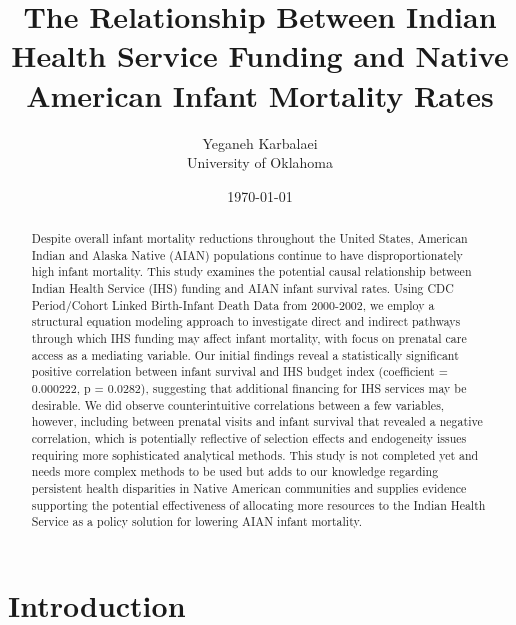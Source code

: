 \documentclass[12pt]{article}
\title{The Relationship Between Indian Health Service Funding and Native American Infant Mortality Rates}
\author{Yeganeh Karbalaei\\
University of Oklahoma}
\date{\today}
\begin{document}
\maketitle
{}

\begin{abstract}
Despite overall infant mortality reductions throughout the United States, American Indian and Alaska Native (AIAN) populations continue to have disproportionately high infant mortality. This study examines the potential causal relationship between Indian Health Service (IHS) funding and AIAN infant survival rates. Using CDC Period/Cohort Linked Birth-Infant Death Data from 2000-2002, we employ a structural equation modeling approach to investigate direct and indirect pathways through which IHS funding may affect infant mortality, with focus on prenatal care access as a mediating variable. Our initial findings reveal a statistically significant positive correlation between infant survival and IHS budget index (coefficient = 0.000222, p = 0.0282), suggesting that additional financing for IHS services may be desirable. We did observe counterintuitive correlations between a few variables, however, including between prenatal visits and infant survival that revealed a negative correlation, which is potentially reflective of selection effects and endogeneity issues requiring more sophisticated analytical methods. This study is not completed yet and needs more complex methods to be used but adds to our knowledge regarding persistent health disparities in Native American communities and supplies evidence supporting the potential effectiveness of allocating more resources to the Indian Health Service as a policy solution for lowering AIAN infant mortality.
\end{abstract} 

\newpage
\section{Introduction}
\end{document}
